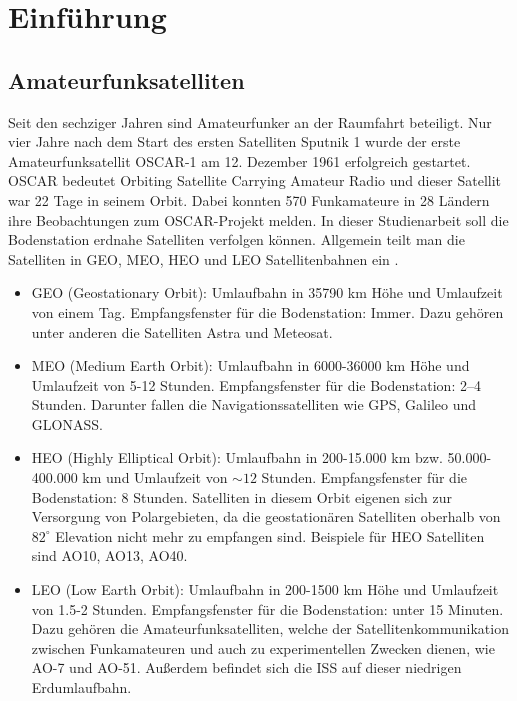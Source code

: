 
\chapter{Einführung}
\label{chap:einfuehrung}
\section{Amateurfunksatelliten}
Seit den sechziger Jahren sind Amateurfunker an der Raumfahrt beteiligt. Nur vier Jahre nach dem 
Start des ersten Satelliten Sputnik 1 wurde der erste Amateurfunksatellit OSCAR-1 am 12. Dezember 
1961 erfolgreich gestartet. OSCAR bedeutet Orbiting Satellite Carrying Amateur Radio und dieser Satellit war 22 
Tage in seinem Orbit. Dabei konnten 570 Funkamateure in 28 Ländern ihre Beobachtungen zum 
OSCAR-Projekt melden.
In dieser Studienarbeit soll die Bodenstation erdnahe Satelliten verfolgen können. 
Allgemein teilt man die Satelliten in GEO, MEO, HEO und LEO Satellitenbahnen ein \cite{orbit}.
\begin{itemize}
  \item GEO (Geostationary Orbit): Umlaufbahn in 35790 km Höhe und Umlaufzeit von einem Tag. Empfangsfenster für die Bodenstation: Immer. Dazu 
gehören unter anderen die Satelliten Astra und Meteosat.
  \item MEO (Medium Earth Orbit): Umlaufbahn in 6000-36000 km Höhe und Umlaufzeit von 5-12 Stunden. Empfangsfenster für die Bodenstation: 2–4 
Stunden. Darunter fallen die Navigationssatelliten wie GPS, Galileo und GLONASS.
  \item HEO (Highly Elliptical Orbit): Umlaufbahn in 200-15.000 km bzw. 50.000-400.000 km und Umlaufzeit von $\sim 12$ Stunden. Empfangsfenster für 
die Bodenstation: 8 Stunden. Satelliten in diesem Orbit eigenen sich zur Versorgung von Polargebieten, da die geostationären Satelliten oberhalb von 
$82^\circ$ Elevation nicht mehr zu empfangen sind. Beispiele für HEO Satelliten sind AO10, AO13, AO40.
  \item LEO (Low Earth Orbit): Umlaufbahn in 200-1500 km Höhe und Umlaufzeit von 1.5-2 Stunden. Empfangsfenster für die Bodenstation: unter 15 
Minuten. Dazu gehören die Amateurfunksatelliten, welche der Satellitenkommunikation zwischen Funkamateuren und auch zu experimentellen Zwecken 
dienen, wie AO-7 und AO-51. Außerdem befindet sich die ISS auf dieser niedrigen Erdumlaufbahn.
\end{itemize}
